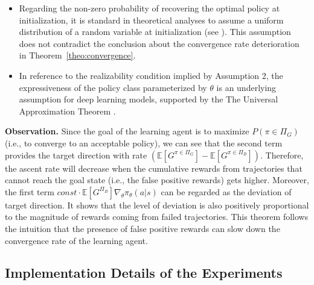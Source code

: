 \documentclass{article}
\theoremstyle{plain}
\theoremstyle{definition}
\theoremstyle{remark}
\begin{document}
\begin{itemize}
    \item Regarding the non-zero probability of recovering the optimal policy at initialization, it is standard in theoretical analyses to assume a uniform distribution of a random variable at initialization (see \citet{agarwal2021theory}). This assumption does not contradict the conclusion about the convergence rate deterioration in Theorem~\ref{theo:convergence}.
    \item In reference to the realizability condition implied by Assumption 2, the expressiveness of the policy class parameterized by $\theta$ is an underlying assumption for deep learning models, supported by the The Universal Approximation Theorem \citep{hornik1989multilayer}. 
\end{itemize}
\noindent \textbf{Observation.} Since the goal of the learning agent is to maximize $P(\pi \in \Pi_G)$ (i.e., to converge to an acceptable policy), we can see that the second term provides the target direction with rate $( \mathbb E [G^{\pi \in \Pi_G}] - \mathbb E [G^{\pi \in \Pi_B}])$. Therefore, the ascent rate will decrease when the cumulative rewards from trajectories that cannot reach the goal state (i.e., the false positive rewards) gets higher. Moreover, the first term $\textit{const} \cdot \mathbb E [G^{\Pi_B}] \nabla_\theta \pi_\theta(a|s)$ can be regarded as the deviation of target direction. It shows that the level of deviation is also positively proportional to the magnitude of rewards coming from failed trajectories. This theorem follows the intuition that the presence of false positive rewards can slow down the convergence rate of the learning agent.

\subsection{Implementation Details of the Experiments}
\label{sec:implementation_details_first_stage}
\end{document}
